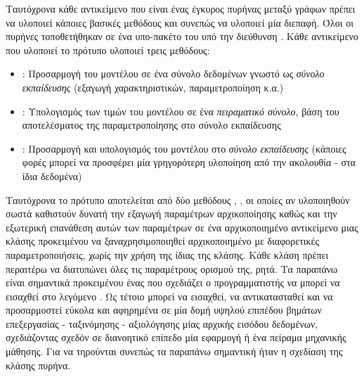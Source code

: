 Ταυτόχρονα κάθε αντικείμενο που είναι ένας έγκυρος πυρήνας μεταξύ γράφων πρέπει να υλοποιεί κάποιες βασικές μεθόδους και συνεπώς να υλοποιεί μία διεπαφή.
Όλοι οι πυρήνες τοποθετήθηκαν σε ένα υπο-πακέτο του  υπό την διεύθυνση .
Κάθε αντικείμενο που υλοποιεί το πρότυπο  υλοποιεί τρεις μεθόδους:
  \begin{itemize}
    \item \texttt{}: Προσαρμογή του μοντέλου σε ένα σύνολο δεδομένων γνωστό ως \textit{σύνολο εκπαίδευσης} (εξαγωγή χαρακτηριστικών, παραμετροποίηση κ.α.)
    \item \texttt{}: Υπολογισμός των τιμών του μοντέλου σε ένα \textit{πειραματικό σύνολο}, βάση του αποτελέσματος της παραμετροποίησης στο σύνολο εκπαίδευσης
    \item \texttt{}: Προσαρμογή και υπολογισμός του μοντέλου στο \textit{σύνολο εκπαίδευσης} (κάποιες φορές μπορεί να προσφέρει μία γρηγορότερη υλοποίηση από την ακολουθία \texttt{} - \texttt{} στα ίδια δεδομένα)
\end{itemize}
Ταυτόχρονα το πρότυπο  αποτελείται από δύο μεθόδους \texttt{}, \texttt{}, οι οποίες αν υλοποιηθούν σωστά καθιστούν δυνατή την εξαγωγή παραμέτρων αρχικοποίησης  καθώς και την εξωτερική επανάθεση αυτών των παραμέτρων σε ένα αρχικοποιημένο αντικείμενο μιας κλάσης προκειμένου να ξαναχρησιμοποιηθεί αρχικοποιημένο με διαφορετικές παραμετροποιήσεις, χωρίς την χρήση της ίδιας της κλάσης.
Κάθε κλάση πρέπει περαιτέρω να διατυπώνει όλες τις παραμέτρους ορισμού της, ρητά.
Τα παραπάνω είναι σημαντικά προκειμένου ένας  που σχεδιάζει ο προγραμματιστής να μπορεί να εισαχθεί στο λεγόμενο .
Ως τέτοιο μπορεί να εισαχθεί, να αντικατασταθεί και να προσαρμοστεί εύκολα και αφηρημένα σε μία δομή υψηλού επιπέδου βημάτων επεξεργασίας - ταξινόμησης - αξιολόγησης μίας αρχικής εισόδου δεδομένων, σχεδιάζοντας σχεδόν σε διανοητικό επίπεδο μία εφαρμογή ή ένα πείραμα μηχανικής μάθησης.
Για να τηρούνται συνεπώς τα παραπάνω σημαντική ήταν η σχεδίαση της κλάσης πυρήνα.
